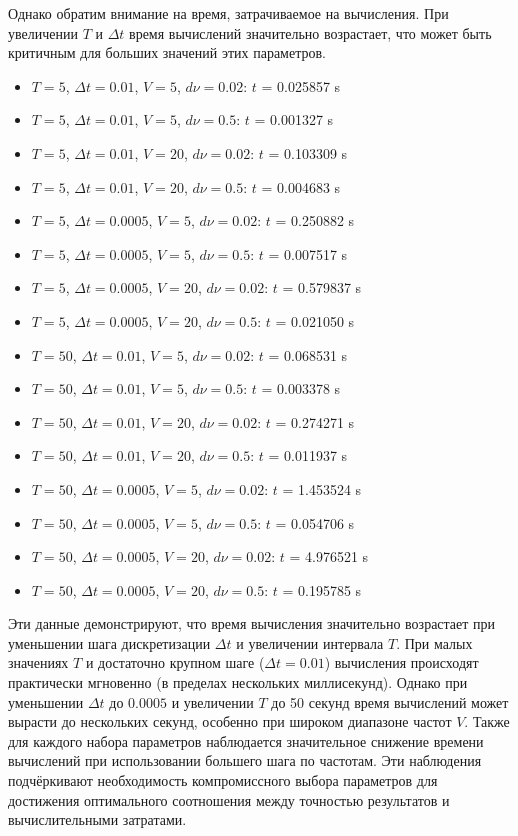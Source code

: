 \documentclass[a4paper]{article}
\begin{document}
Однако обратим внимание на время, затрачиваемое на вычисления. При увеличении $T$ и $\Delta t$ время вычислений значительно возрастает, что может быть критичным для больших значений этих параметров.
\begin{itemize}
  \item $T=5$, $\Delta t=0.01$, $V=5$, $d\nu=0.02$: $t$ = 0.025857 s
  \item $T=5$, $\Delta t=0.01$, $V=5$, $d\nu=0.5$: $t$ = 0.001327 s
  \item $T=5$, $\Delta t=0.01$, $V=20$, $d\nu=0.02$: $t$ = 0.103309 s
  \item $T=5$, $\Delta t=0.01$, $V=20$, $d\nu=0.5$: $t$ = 0.004683 s
  \item $T=5$, $\Delta t=0.0005$, $V=5$, $d\nu=0.02$: $t$ = 0.250882 s
  \item $T=5$, $\Delta t=0.0005$, $V=5$, $d\nu=0.5$: $t$ = 0.007517 s
  \item $T=5$, $\Delta t=0.0005$, $V=20$, $d\nu=0.02$: $t$ = 0.579837 s
  \item $T=5$, $\Delta t=0.0005$, $V=20$, $d\nu=0.5$: $t$ = 0.021050 s
  \item $T=50$, $\Delta t=0.01$, $V=5$, $d\nu=0.02$: $t$ = 0.068531 s
  \item $T=50$, $\Delta t=0.01$, $V=5$, $d\nu=0.5$: $t$ = 0.003378 s
  \item $T=50$, $\Delta t=0.01$, $V=20$, $d\nu=0.02$: $t$ = 0.274271 s
  \item $T=50$, $\Delta t=0.01$, $V=20$, $d\nu=0.5$: $t$ = 0.011937 s
  \item $T=50$, $\Delta t=0.0005$, $V=5$, $d\nu=0.02$: $t$ = 1.453524 s
  \item $T=50$, $\Delta t=0.0005$, $V=5$, $d\nu=0.5$: $t$ = 0.054706 s
  \item $T=50$, $\Delta t=0.0005$, $V=20$, $d\nu=0.02$: $t$ = 4.976521 s
  \item $T=50$, $\Delta t=0.0005$, $V=20$, $d\nu=0.5$: $t$ = 0.195785 s
\end{itemize}

Эти данные демонстрируют, что время вычисления значительно возрастает при уменьшении шага дискретизации $\Delta t$ и увеличении интервала $T$. При малых значениях $T$ и достаточно крупном шаге ($\Delta t=0.01$) вычисления происходят практически мгновенно (в пределах нескольких миллисекунд). Однако при уменьшении $\Delta t$ до $0.0005$ и увеличении $T$ до 50 секунд время вычислений может вырасти до нескольких секунд, особенно при широком диапазоне частот $V$. Также для каждого набора параметров наблюдается значительное снижение времени вычислений при использовании большего шага по частотам. Эти наблюдения подчёркивают необходимость компромиссного выбора параметров для достижения оптимального соотношения между точностью результатов и вычислительными затратами.
\end{document}
